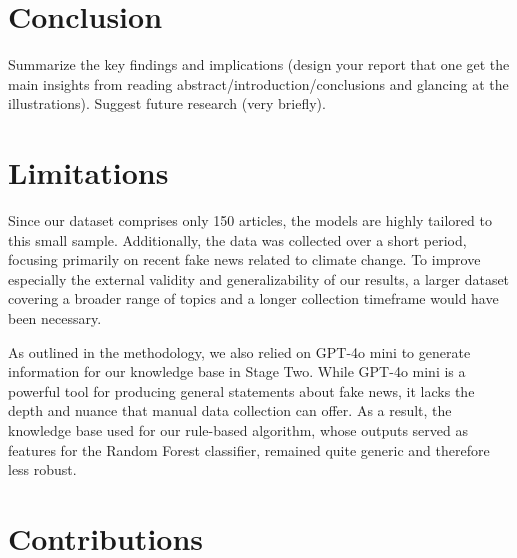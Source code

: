 \documentclass[12pt,a4paper,twocolumn]{article}
\begin{document}
\section{Conclusion}
\label{sec:conclusion}
Summarize the key findings and implications (design your report that one get the main insights from reading abstract/introduction/conclusions and glancing at the illustrations). 
Suggest future research (very briefly).


\newpage

\section*{Limitations}
Since our dataset comprises only 150 articles, the models are highly tailored to this small sample. Additionally, the data was collected over a short period, focusing primarily on recent fake news related to climate change. To improve especially the external validity and generalizability of our results, a larger dataset covering a broader range of topics and a longer collection timeframe would have been necessary.

As outlined in the methodology, we also relied on GPT-4o mini to generate information for our knowledge base in Stage Two. While GPT-4o mini is a powerful tool for producing general statements about fake news, it lacks the depth and nuance that manual data collection can offer. As a result, the knowledge base used for our rule-based algorithm, whose outputs served as features for the Random Forest classifier, remained quite generic and therefore less robust.

\section*{Contributions}
\end{document}
